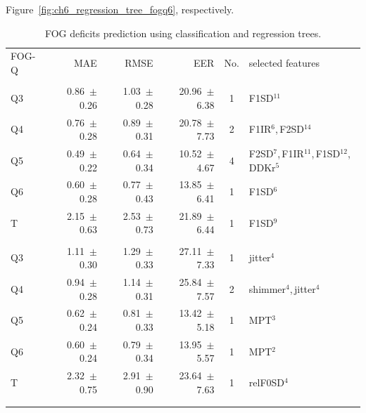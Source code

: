 Figure~\ref{fig:ch6_regression_tree_fogq6}, respectively.

\begin{table}[htb!]
\centering
	\begin{threeparttable}
		\caption{FOG deficits prediction using classification and regression trees.}
		\label{tab:ch6_regression_analysis}
		\footnotesize
		\centering
		\begin{tabular}{l r r r c l}
			
			\hline\hline\noalign{\smallskip}
			\rowcolor{gray_table}
			FOG-Q & MAE & RMSE & EER & No. & selected features \\
			\noalign{\smallskip}
			\multicolumn{6}{c}{Articulation} \\
			\noalign{\smallskip}\hline\noalign{\smallskip}

			Q3 & 0.86~$\pm$~0.26 & 1.03~$\pm$~0.28 & 20.96~$\pm$~6.38 & 1 & F1SD$^{11}$ \\
			Q4 & 0.76~$\pm$~0.28 & 0.89~$\pm$~0.31 & 20.78~$\pm$~7.73 & 2 & F1IR$^{6}$,\,F2SD$^{14}$ \\
			Q5 & 0.49~$\pm$~0.22 & 0.64~$\pm$~0.34 & 10.52~$\pm$~4.67 & 4 & F2SD$^{7}$,\,F1IR$^{11}$,\,F1SD$^{12}$,\,DDKr$^{5}$ \\
			Q6 & 0.60~$\pm$~0.28 & 0.77~$\pm$~0.43 & 13.85~$\pm$~6.41 & 1 & F1SD$^{6}$ \\
			T  & 2.15~$\pm$~0.63 & 2.53~$\pm$~0.73 & 21.89~$\pm$~6.44 & 1 & F1SD$^{9}$ \\

			\noalign{\smallskip}\hline\noalign{\smallskip}
			\multicolumn{6}{c}{Phonation} \\
			\noalign{\smallskip}\hline\noalign{\smallskip}

			Q3 & 1.11~$\pm$~0.30 & 1.29~$\pm$~0.33 & 27.11~$\pm$~7.33 & 1 & jitter$^{4}$ \\
			Q4 & 0.94~$\pm$~0.28 & 1.14~$\pm$~0.31 & 25.84~$\pm$~7.57 & 2 & shimmer$^{4}$,\,jitter$^{4}$ \\
			Q5 & 0.62~$\pm$~0.24 & 0.81~$\pm$~0.33 & 13.42~$\pm$~5.18 & 1 & MPT$^{3}$ \\
			Q6 & 0.60~$\pm$~0.24 & 0.79~$\pm$~0.34 & 13.95~$\pm$~5.57 & 1 & MPT$^{2}$ \\
			T  & 2.32~$\pm$~0.75 & 2.91~$\pm$~0.90 & 23.64~$\pm$~7.63 & 1 & relF0SD$^{4}$ \\

			\noalign{\smallskip}\hline\noalign{\smallskip}
			\multicolumn{6}{c}{Prosody} \\
			\noalign{\smallskip}\hline\noalign{\smallskip}


\end{tabular}
\end{threeparttable}
\end{table}
